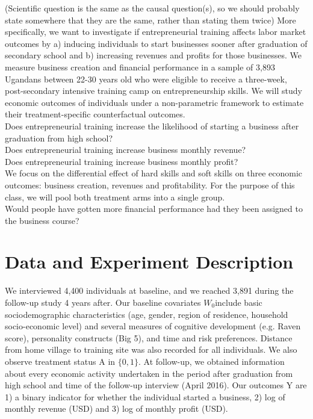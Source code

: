 \documentclass[oneside, notitlepage]{book}
\begin{document}
(Scientific question is the same as the causal question(s), so we should probably state somewhere that they are the same, rather than stating them twice)
More specifically, we want to investigate if entrepreneurial training affects labor market outcomes by a) inducing individuals to start businesses sooner after graduation of secondary school and b) increasing revenues and profits for those businesses. We measure business creation and financial performance in a sample of 3,893 Ugandans between 22-30 years old who were eligible to receive a three-week, post-secondary intensive training camp on entrepreneurship skills. We will study economic outcomes of individuals under a non-parametric framework to estimate their treatment-specific counterfactual outcomes.\\

Does entrepreneurial training increase the likelihood of starting a business after graduation from high school?\\
Does entrepreneurial training increase business monthly revenue?\\
Does entrepreneurial training increase business monthly profit?\\

We focus on the differential effect of hard skills and soft skills on three economic outcomes: business creation, revenues and profitability. For the purpose of this class, we will pool both treatment arms into a single group.\\

Would people have gotten more financial performance had they been assigned to the business course?\\


\section{Data and Experiment Description}
\label{cha:data-exper-descr}

We interviewed 4,400 individuals at baseline, and we reached 3,891 during the follow-up study 4 years after. Our baseline covariates $W_0$include basic sociodemographic characteristics (age, gender, region of residence, household socio-economic level) and several measures of cognitive development (e.g. Raven score), personality constructs (Big 5), and time and risk preferences. Distance from home village to training site was also recorded for all individuals. We also observe treatment status A in $\{0,1\}$. At follow-up, we obtained information about every economic activity undertaken in the period after graduation from high school and time of the follow-up interview (April 2016). Our outcomes Y are 1) a binary indicator for whether the individual started a business, 2) log of monthly revenue (USD) and 3) log of monthly profit (USD).\\
\end{document}
